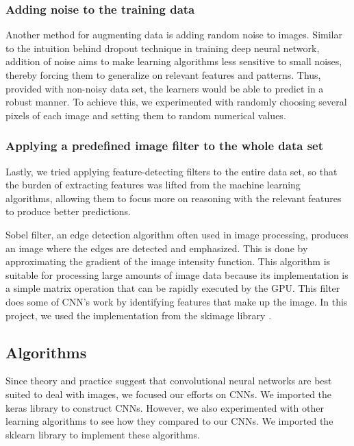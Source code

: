 \documentclass[11pt]{article}
\begin{document}
	
	\subsubsection{Adding noise to the training data}
	Another method for augmenting data is adding random noise to images. Similar to the intuition behind dropout technique in training deep neural network, addition of noise aims to make learning algorithms less sensitive to small noises, thereby forcing them to generalize on relevant features and patterns.  Thus, provided with non-noisy data set, the learners would be able to predict in a robust manner. To achieve this, we experimented with randomly choosing several pixels of each image and setting them to random numerical values.
	
	\subsubsection{Applying a predefined image filter to the whole data set}
	Lastly, we tried applying feature-detecting filters to the entire data set, so that the burden of extracting features was lifted from the machine learning algorithms, allowing them to focus more on reasoning with the relevant features to produce better predictions.
	
	Sobel filter, an edge detection algorithm often used in image processing, produces an image where the edges are detected and emphasized. This is done by approximating the gradient of the image intensity function. This algorithm is suitable for processing large amounts of image data because its implementation is a simple matrix operation that can be rapidly executed by the GPU. This filter does some of CNN's work by identifying features that make up the image. In this project, we used the implementation from the skimage library \cite{scikit-image}.
	
	\subsection{Algorithms}
Since theory and practice suggest that convolutional neural networks are best suited to deal with images, we focused our efforts on CNNs.  We imported the keras library to construct CNNs. However, we also experimented with other learning algorithms to see how they compared to our CNNs.  We imported the sklearn library to implement these algorithms.
			 
\end{document}
